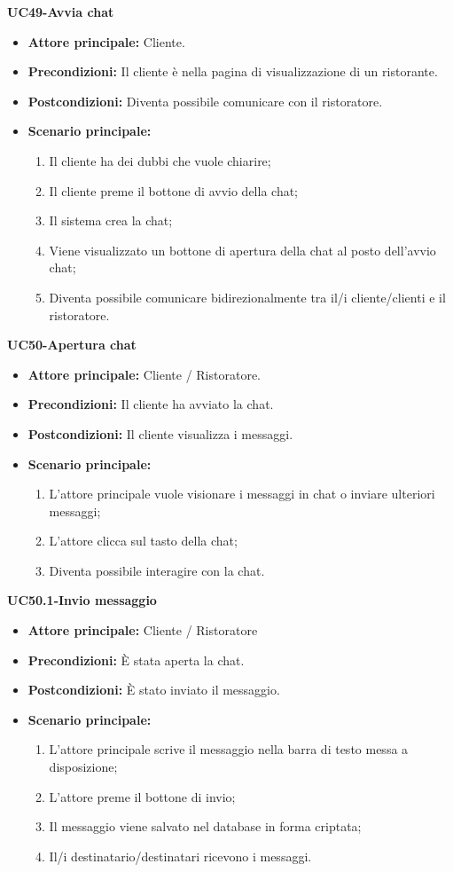 
\textbf{UC49-Avvia chat}
\begin{itemize}
\item \textbf{Attore principale:} Cliente.
\item \textbf{Precondizioni:} Il cliente è nella pagina di visualizzazione di un ristorante.
\item \textbf{Postcondizioni:} Diventa possibile comunicare con il ristoratore.
\item \textbf{Scenario principale:}
\begin{enumerate}
    \item Il cliente ha dei dubbi che vuole chiarire;
    \item Il cliente preme il bottone di avvio della chat;
    \item Il sistema crea la chat;
    \item Viene visualizzato un bottone di apertura della chat al posto dell'avvio chat;
    \item Diventa possibile comunicare bidirezionalmente tra il/i cliente/clienti e il ristoratore.
\end{enumerate}
\end{itemize}

\textbf{UC50-Apertura chat}
\begin{itemize}
\item \textbf{Attore principale:} Cliente / Ristoratore.
\item \textbf{Precondizioni:} Il cliente ha avviato la chat.
\item \textbf{Postcondizioni:} Il cliente visualizza i messaggi.
\item \textbf{Scenario principale:}
\begin{enumerate}
    \item L'attore principale vuole visionare i messaggi in chat o inviare ulteriori messaggi;
    \item L'attore clicca sul tasto della chat;
    \item Diventa possibile interagire con la chat.
\end{enumerate}
\end{itemize}

\textbf{UC50.1-Invio messaggio}
\begin{itemize}
\item \textbf{Attore principale:} Cliente / Ristoratore
\item \textbf{Precondizioni:} È stata aperta la chat.
\item \textbf{Postcondizioni:} È stato inviato il messaggio.
\item \textbf{Scenario principale:}
\begin{enumerate}
    \item L'attore principale scrive il messaggio nella barra di testo messa a disposizione;
    \item L'attore preme il bottone di invio;
    \item Il messaggio viene salvato nel database in forma criptata;
    \item Il/i destinatario/destinatari ricevono i messaggi.
\end{enumerate}
\end{itemize}

